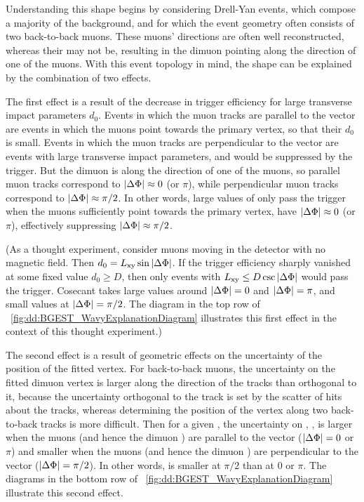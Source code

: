 Understanding this shape begins by considering Drell-Yan events, which compose a majority of the background, and for which the event geometry often consists of two back-to-back muons.
These muons' directions are often well reconstructed, whereas their \pT may not be, resulting in the dimuon \pT pointing along the direction of one of the muons.
With this event topology in mind, the shape can be explained by the combination of two effects.

The first effect is a result of the decrease in trigger efficiency for large transverse impact parameters $d_{0}$.
Events in which the muon tracks are parallel to the \Lxy vector are events in which the muons point towards the primary vertex, so that their $d_0$ is small.
Events in which the muon tracks are perpendicular to the \Lxy vector are events with large transverse impact parameters, and would be suppressed by the trigger.
But the dimuon \pT is along the direction of one of the muons, so parallel muon tracks correspond to $|\Delta\Phi| \approx 0$ (or $\pi$), while perpendicular muon tracks correspond to $|\Delta\Phi| \approx \pi/2$.
In other words, large values of \Lxy only pass the trigger when the muons sufficiently point towards the primary vertex, \ie have $|\Delta\Phi| \approx 0$ (or $\pi$), effectively suppressing $|\Delta\Phi| \approx \pi/2$.

(As a thought experiment, consider muons moving in the detector with no magnetic field. Then $d_0 = L_{\mathrm{xy}} \sin{\ensuremath{|\Delta\Phi|}}$.
If the trigger efficiency sharply vanished at some fixed value $d_0 \geq D$, then only events with $L_{\mathrm{xy}} \leq D \csc{\ensuremath{|\Delta\Phi|}}$ would pass the trigger.
Cosecant takes large values around $|\Delta\Phi| = 0$ and $|\Delta\Phi| = \pi$, and small values at $|\Delta\Phi| = \pi/2$.
The diagram in the top row of \Fig~\ref{fig:dd:BGEST_WavyExplanationDiagram} illustrates this first effect in the context of this thought experiment.)

The second effect is a result of geometric effects on the uncertainty of the position of the fitted vertex.
For back-to-back muons, the uncertainty on the fitted dimuon vertex is larger along the direction of the tracks than orthogonal to it, because the uncertainty orthogonal to the track is set by the scatter of hits about the tracks, whereas determining the position of the vertex along two back-to-back tracks is more difficult.
Then for a given \Lxy, the uncertainty on \Lxy, \LxyErr, is larger when the muons (and hence the dimuon \pT) are parallel to the \Lxy vector (\ie $|\Delta\Phi| = 0$ or $\pi$) and smaller when the muons (and hence the dimuon \pT) are perpendicular to the \Lxy vector (\ie $|\Delta\Phi| = \pi/2$).
In other words, \LxyErr is smaller at $\pi/2$ than at 0 or $\pi$.
The diagrams in the bottom row of \Fig~\ref{fig:dd:BGEST_WavyExplanationDiagram} illustrate this second effect.

